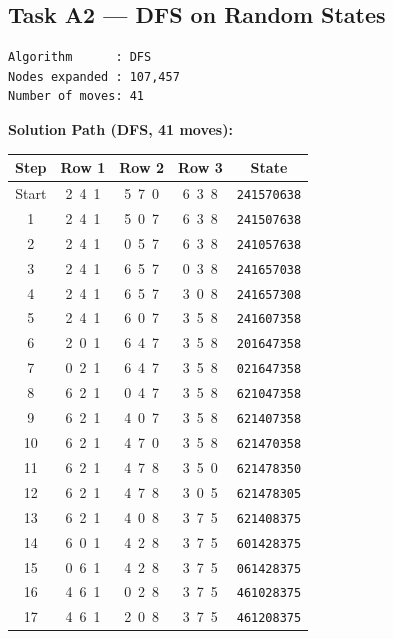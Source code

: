 \documentclass[12pt, a4paper]{article}
\begin{document}
\subsection{Task A2 --- DFS on Random States}

\begin{lstlisting}[style=mono]
Algorithm      : DFS
Nodes expanded : 107,457
Number of moves: 41
\end{lstlisting}

\textbf{Solution Path (DFS, 41 moves):}

\begin{center}
\small
\begin{tabular}{ccccc}
\toprule
\textbf{Step} & \textbf{Row 1} & \textbf{Row 2} & \textbf{Row 3} & \textbf{State} \\
\midrule
\rowcolor{lightblue}
Start & 2\ 4\ 1 & 5\ 7\ 0 & 6\ 3\ 8 & \texttt{241570638} \\
1  & 2\ 4\ 1 & 5\ 0\ 7 & 6\ 3\ 8 & \texttt{241507638} \\
2  & 2\ 4\ 1 & 0\ 5\ 7 & 6\ 3\ 8 & \texttt{241057638} \\
3  & 2\ 4\ 1 & 6\ 5\ 7 & 0\ 3\ 8 & \texttt{241657038} \\
4  & 2\ 4\ 1 & 6\ 5\ 7 & 3\ 0\ 8 & \texttt{241657308} \\
5  & 2\ 4\ 1 & 6\ 0\ 7 & 3\ 5\ 8 & \texttt{241607358} \\
6  & 2\ 0\ 1 & 6\ 4\ 7 & 3\ 5\ 8 & \texttt{201647358} \\
7  & 0\ 2\ 1 & 6\ 4\ 7 & 3\ 5\ 8 & \texttt{021647358} \\
8  & 6\ 2\ 1 & 0\ 4\ 7 & 3\ 5\ 8 & \texttt{621047358} \\
9  & 6\ 2\ 1 & 4\ 0\ 7 & 3\ 5\ 8 & \texttt{621407358} \\
10 & 6\ 2\ 1 & 4\ 7\ 0 & 3\ 5\ 8 & \texttt{621470358} \\
11 & 6\ 2\ 1 & 4\ 7\ 8 & 3\ 5\ 0 & \texttt{621478350} \\
12 & 6\ 2\ 1 & 4\ 7\ 8 & 3\ 0\ 5 & \texttt{621478305} \\
13 & 6\ 2\ 1 & 4\ 0\ 8 & 3\ 7\ 5 & \texttt{621408375} \\
14 & 6\ 0\ 1 & 4\ 2\ 8 & 3\ 7\ 5 & \texttt{601428375} \\
15 & 0\ 6\ 1 & 4\ 2\ 8 & 3\ 7\ 5 & \texttt{061428375} \\
16 & 4\ 6\ 1 & 0\ 2\ 8 & 3\ 7\ 5 & \texttt{461028375} \\
17 & 4\ 6\ 1 & 2\ 0\ 8 & 3\ 7\ 5 & \texttt{461208375} \\

\end{tabular}
\end{center}
\end{document}
